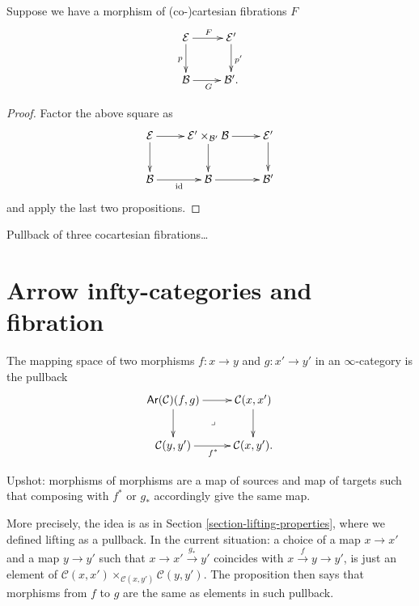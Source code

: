 \begin{exercise}
\label{exercise-pullback-iff-equivalence-on-fibers-for-infty-categrories}
Suppose we have a morphism of (co-)cartesian fibrations $F$
$$
\xymatrix{
\mathcal{E}\ar[r]^{F}\ar[d]_{p}&\mathcal{E}'\ar[d]^{p'}\\
\mathcal{B}\ar[r]_{G}&\mathcal{B}'.
}
$$
\end{exercise}

\begin{proof}
Factor the above square as
$$
\xymatrix{
\mathcal{E}\ar[r]\ar[d]&\mathcal{E}'\times_{\mathcal{B}'}\mathcal{B}\ar[d]\ar[r]
&\mathcal{E}'\ar[d]\\
\mathcal{B}\ar[r]_{\text{id}}&\mathcal{B}\ar[r]&\mathcal{B}'
}
$$
and apply the last two propositions.
\end{proof}

\begin{exercise}
\label{exercise-pullback-of-three-fibrations}
Pullback of three cocartesian fibrations…
\end{exercise}






\section{Arrow infty-categories and fibration}
\label{section-arrow-infty-categories}

\begin{proposition}
\label{proposition-pullback-in-arrow-category}
The mapping space of two morphisms
$f:x \to y$ and $g:x'\to y'$ in an $\infty$-category is the pullback
$$
\xymatrix{
\mathsf{Ar}(\mathcal{C})(f,g)\ar[r]\ar[d]\ar@{}[dr]|-{\lrcorner}
&\mathcal{C}(x,x')\ar[d]\\
\mathcal{C}(y,y')\ar[r]_{f^*}&
\mathcal{C}(x,y').
}
$$
\end{proposition}

\noindent
Upshot: morphisms of morphisms are 
a map of sources and map of targets such that
composing with $f^*$ or $g_*$ accordingly
give the same map.

More precisely,
the idea is as in Section \ref{section-lifting-properties},
where we defined lifting as a pullback.
In the current situation: a choice of 
a map $x \to x'$ and a map $y \to y'$
such that $x \to x' \xrightarrow{g_*}y'$ 
coincides with
$x \xrightarrow{f} y \to y'$,
is just an element of
$\mathcal{C}(x,x')\times_{\mathcal{C}(x,y')}\mathcal{C}(y,y')$.
The proposition then says that morphisms from $f$ to $g$ 
are the same as elements in such pullback.

